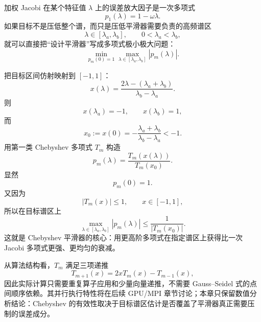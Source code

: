 加权 Jacobi 在某个特征值 $\lambda$ 上的误差放大因子是一次多项式
\begin{equation}
p_1(\lambda)=1-\omega\lambda.
\end{equation}
如果目标不是压低整个谱，而只是压低平滑器需要负责的高频谱区
\begin{equation}
\lambda\in[\lambda_a,\lambda_b],
\qquad
0<\lambda_a<\lambda_b,
\end{equation}
就可以直接把“设计平滑器”写成多项式极小极大问题：
\begin{equation}
\min_{p_m(0)=1}
\max_{\lambda\in[\lambda_a,\lambda_b]}
|p_m(\lambda)|.
\label{eq:lfa-polynomial-smoother-minimax}
\end{equation}

把目标区间仿射映射到 $[-1,1]$：
\begin{equation}
x(\lambda)
=
\frac{2\lambda-(\lambda_a+\lambda_b)}
{\lambda_b-\lambda_a}.
\label{eq:lfa-chebyshev-affine-map}
\end{equation}
则
\begin{equation}
x(\lambda_a)=-1,
\qquad
x(\lambda_b)=1,
\end{equation}
而
\begin{equation}
x_0:=x(0)
=
-\frac{\lambda_a+\lambda_b}
{\lambda_b-\lambda_a}
<-1.
\end{equation}
用第一类 Chebyshev 多项式 $T_m$ 构造
\begin{equation}
\boxed{
p_m(\lambda)
=
\frac{T_m(x(\lambda))}
{T_m(x_0)}.
}
\label{eq:lfa-chebyshev-polynomial}
\end{equation}
显然
\begin{equation}
p_m(0)=1.
\end{equation}
又因为
\begin{equation}
|T_m(x)|\le1,
\qquad x\in[-1,1],
\end{equation}
所以在目标谱区上
\begin{equation}
\boxed{
\max_{\lambda\in[\lambda_a,\lambda_b]}
|p_m(\lambda)|
\le
\frac1{|T_m(x_0)|}.
}
\label{eq:lfa-chebyshev-bound}
\end{equation}
这就是 Chebyshev 平滑器的核心：用更高阶多项式在指定谱区上获得比一次 Jacobi 多项式更强、更均匀的衰减。

从算法结构看，$T_m$ 满足三项递推
\begin{equation}
T_{m+1}(x)=2xT_m(x)-T_{m-1}(x),
\end{equation}
因此实际计算只需要重复算子应用和少量向量递推，不需要 Gauss--Seidel 式的点间顺序依赖。其并行执行特性将在后续 GPU/MPI 章节讨论；本章只保留数值分析结论：Chebyshev 的有效性取决于目标谱区估计是否覆盖了平滑器真正需要压制的误差成分\cite{baker2011smoothers,bergervergiat2021twostage,hypreBoomer2026}。

